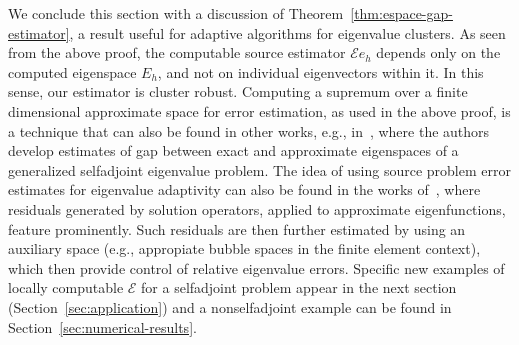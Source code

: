 \documentclass[12pt, oneside, reqno]{amsart}
\theoremstyle{remark}
\newtheorem{remark}[theorem]{Remark}
\renewcommand{\hat}{\widehat}
\newcommand{\EE}{\mathcal{E}}
\begin{document}
We conclude this section with a discussion of
Theorem~\ref{thm:espace-gap-estimator}, a  result  useful for
adaptive algorithms for eigenvalue clusters.  As seen
from the above proof, the computable source estimator $\EE \hat e_h$ depends
only on the computed eigenspace $E_h$, and not on individual
eigenvectors within it. In this sense, our estimator is cluster
robust.   Computing a supremum over a finite dimensional
approximate space for error estimation, as used in the above proof,
is a technique that can also be found in other works, e.g.,
in~\cite{LiuVej2022-1}, where the authors develop estimates of gap between exact and
approximate eigenspaces of a generalized selfadjoint eigenvalue
problem. The idea of using source problem error estimates for
eigenvalue adaptivity can also be found in the works
of~\cite{GruOva2009-1, BanGruOva2013-1,%
  GianiEtAl2016-1, GiaGruHakOva2021-1}, where residuals generated by
solution operators, applied to approximate eigenfunctions, feature
prominently.  Such residuals are then further estimated by using an
auxiliary space (e.g., appropiate bubble spaces in the finite element
context), which then provide control of relative eigenvalue errors.
Specific new examples of locally computable $\EE$ for a selfadjoint problem appear in the
next section (Section~\ref{sec:application}) and a nonselfadjoint example can be found in Section~\ref{sec:numerical-results}.


\end{document}
